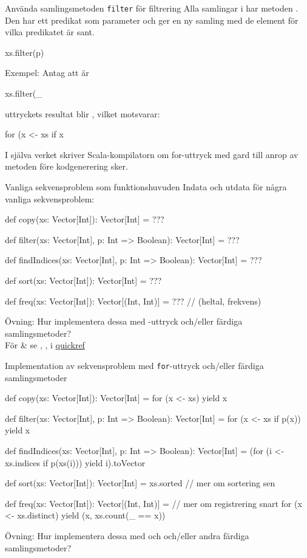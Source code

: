 \begin{Slide}{Använda samlingsmetoden \texttt{filter} för filtrering}
Alla samlingar i  har metoden . Den har ett predikat som parameter  och ger en ny samling med de element för vilka predikatet är sant.
\begin{Code}[basicstyle=\ttfamily\SlideFontSize{12}{14}]
xs.filter(p)
\end{Code}
\pause
Exempel: Antag att  är 
\begin{REPLnonum}
xs.filter(_ %
\end{REPLnonum}
\pause
uttryckets resultat blir , vilket motsvarar:
\begin{Code}[basicstyle=\ttfamily\SlideFontSize{10}{13}]
for (x <- xs if x %
\end{Code}
\pause
I själva verket skriver Scala-kompilatorn om for-uttryck med gard till anrop av metoden  före kodgenerering sker.
\end{Slide}


\begin{Slide}{Vanliga sekvensproblem som funktionshuvuden}
Indata och utdata för några vanliga sekvensproblem:
\begin{Code}
def copy(xs: Vector[Int]): Vector[Int] = ???

def filter(xs: Vector[Int], p: Int => Boolean): Vector[Int] = ???

def findIndices(xs: Vector[Int], p: Int => Boolean): Vector[Int] = ???

def sort(xs: Vector[Int]): Vector[Int] = ???

def freq(xs: Vector[Int]): Vector[(Int, Int)] = ???  // (heltal, frekvens)
\end{Code}
Övning: Hur implementera dessa med -uttryck och/eller färdiga samlingsmetoder?\\
 För \& se , ,  i \href{http://cs.lth.se/pgk/quickref/}{quickref}
\end{Slide}


\begin{Slide}{Implementation av sekvensproblem med \texttt{for}-uttryck och/eller färdiga samlingsmetoder}
\begin{Code}
def copy(xs: Vector[Int]): Vector[Int] = for (x <- xs) yield x

def filter(xs: Vector[Int], p: Int => Boolean): Vector[Int] =
  for (x <- xs if p(x)) yield x

def findIndices(xs: Vector[Int], p: Int => Boolean): Vector[Int] =
  (for (i <- xs.indices if p(xs(i))) yield i).toVector

def sort(xs: Vector[Int]): Vector[Int] = xs.sorted // mer om sortering sen

def freq(xs: Vector[Int]): Vector[(Int, Int)] = // mer om registrering snart
  for (x <- xs.distinct) yield (x, xs.count(_ == x))
\end{Code}
Övning: Hur implementera dessa med  och  och/eller andra färdiga samlingsmetoder?
\end{Slide}

